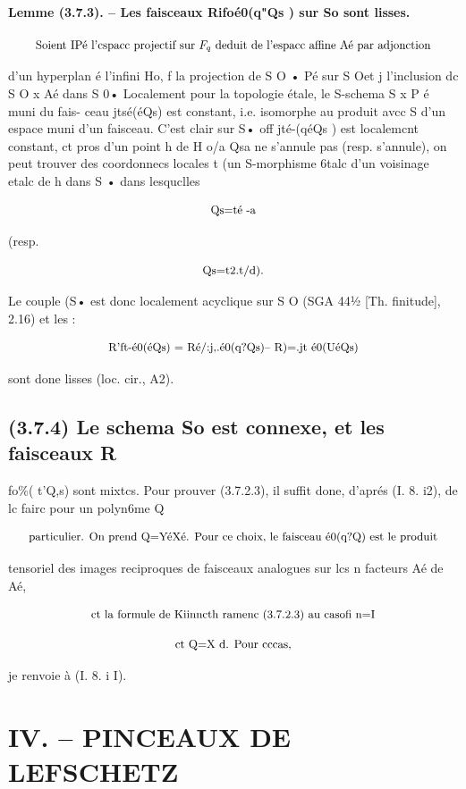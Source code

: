 \documentclass[11pt]{article}
\theoremstyle{remark}
\begin{document}
\paragraph{Lemme (3.7.3). -- Les faisceaux Rifoé0(q"Qs ) sur So sont lisses.}

\[\text{\small Soient IPé l'cspacc projectif sur \(F_q\) deduit de l'espacc affine Aé par adjonction}\]

d'un hyperplan é l'infini Ho, f la projection de S O • Pé sur S Oet j l'inclusion dc S O x Aé dans S 0• Localement pour la topologie étale, le S-schema S x P é muni du fais- ceau jtsé(éQs) est constant, i.e. isomorphe au produit avcc S d'un espace muni d'un faisceau. C'est clair sur S• off jté-(qéQs ) est localemcnt constant, ct pros d'un point h de H o/a Qsa ne s'annule pas (resp. s'annule), on peut trouver des coordonnecs locales t (un S-morphisme 6talc d'un voisinage etalc de h dans S • dans lesquclles

\[\text{\small Qs=té -a}\]

(resp.

\[\text{\small Qs=t2.t/d).}\]

Le couple (S• est donc localement acyclique sur S O (SGA 44½ [Th. finitude], 2.16) et les :

\[\text{\small R'ft-é0(éQs) = Ré/:j,.é0(q?Qs)-- R)=.jt é0(UéQs)}\]

sont done lisses (loc. cir., A2).

\subsection*{(3.7.4) Le schema So est connexe, et les faisceaux R}

fo\%( t'Q,s) sont mixtcs. Pour prouver (3.7.2.3), il suffit done, d'aprés (I. 8. i2), de lc fairc pour un polyn6me Q

\[\text{\small particulier. On prend Q=YéXé. Pour ce choix, le faisceau é0(q?Q) est le produit}\]

tensoriel des images reciproques de faisceaux analogues sur lcs n facteurs Aé de Aé,

\[\text{\small ct la formule de Kiinncth ramenc (3.7.2.3) au casofi n=I}\]

\[\text{\small ct Q=X d. Pour cccas,}\]

je renvoie à (I. 8. i I).

\section*{IV. -- PINCEAUX DE LEFSCHETZ}
\end{document}
